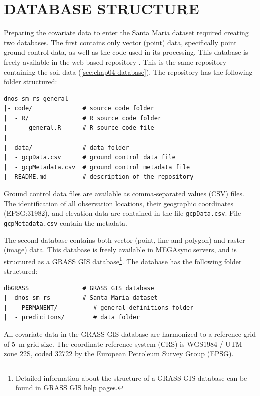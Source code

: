 \section{DATABASE STRUCTURE}
\label{sec:chap05-database}

Preparing the covariate data to enter the Santa Maria dataset required creating two databases. The first 
contains only vector (point) data, specifically point ground control data, as well as the code used in its 
processing. This database is freely available in the web-based \git{} repository \github{}. This is the same 
repository containing the soil data (\autoref{sec:chap04-database}). The repository has the following folder 
structured:

\begin{verbatim}
dnos-sm-rs-general
|- code/              # source code folder
|  - R/               # R source code folder
|    - general.R      # R source code file
|
|- data/              # data folder
|  - gcpData.csv      # ground control data file
|  - gcpMetadata.csv  # ground control metadata file
|- README.md          # description of the repository
\end{verbatim}

Ground control data files are available as comma-separated values (CSV) files. The identification of all 
observation locations, their geographic coordinates (EPSG:31982), and elevation data are contained in the file 
\texttt{gcpData.csv}. File \texttt{gcpMetadata.csv} contain the metadata.

\def\megasync{\href{https://mega.nz}{MEGAsync}}

\def\footgrass{\footnote{Detailed information about the structure of a GRASS GIS database can be found in 
GRASS GIS \href{https://grass.osgeo.org/grass64/manuals/helptext.html}{help pages}.}}

The second database contains both vector (point, line and polygon) and raster (image) data. This database is 
freely available in \megasync{} servers, and is structured as a GRASS GIS database\footgrass{}. The database 
has the following folder structured:

\begin{verbatim}
dbGRASS               # GRASS GIS database
|- dnos-sm-rs         # Santa Maria dataset
|  - PERMANENT/          # general definitions folder
|  - predicitons/        # data folder
\end{verbatim}

All covariate data in the GRASS GIS database are harmonized to a reference grid of \SI{5}{\m} grid size. The 
coordinate reference system (CRS) is WGS1984 / UTM zone 22S, coded 
\href{http://spatialreference.org/ref/epsg/32722/}{\num{32722}} by the European Petroleum Survey Group 
(\href{http://www.epsg.org/}{EPSG}).


